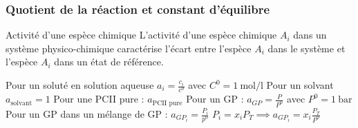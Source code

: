 \documentclass[a4paper,french,bookmarks]{book}
\begin{document}
    \subsubsection{Quotient de la réaction et constant d'équilibre}
    
    \begin{definition}{Activité d'une espèce chimique}{}
        L'activité d'une espèce chimique $A_i$ dans un système physico-chimique caractérise l'écart entre l'espèce $A_i$ dans le système et l'espèce $A_i$ dans un état de référence.
        \begin{enumerate}
            \itt Pour un soluté en solution aqueuse $a_i = \frac{c_i}{c^0}$ avec $C^0 = \qty{1}{\mol\per\litre}$
            \itt Pour un solvant $a_{\text{solvant}} = 1$
            \itt Pour une PCII pure : $a_{\text{PCII pure}}$
            \itt Pour un GP : $a_{GP} = \frac{P}{P^0}$ avec $P^0 = \qty{1}{\bar}$
            \itt Pour un GP dans un mélange de GP : $a_{GP_i} = \frac{P_i}{p^0}$
            $P_i = x_i P_T \implies a_{GP_i} = x_i\frac{P_T}{P^0}$
        \end{enumerate}
        
    \end{definition}
\end{document}
